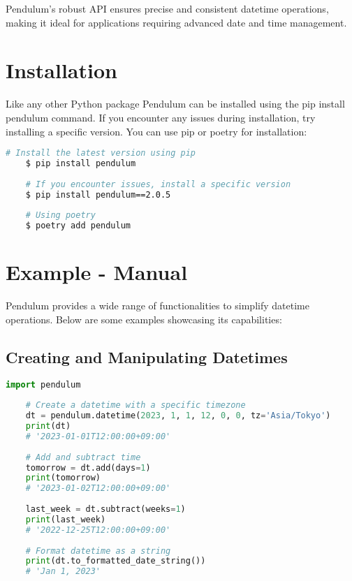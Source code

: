 Pendulum’s robust API ensures precise and consistent datetime operations, making it ideal for applications requiring advanced date and time management.

\section{Installation}

Like any other Python package Pendulum can be installed using the pip install pendulum command. If you encounter any issues during installation, try installing a specific version. You can use pip or poetry for installation:
\begin{lstlisting}[language=Bash, caption={Installing Pendulum via pip and poetry}, label={code:install-pendulum}, style=bashstyle]
	# Install the latest version using pip
	$ pip install pendulum
	
	# If you encounter issues, install a specific version
	$ pip install pendulum==2.0.5
	
	# Using poetry
	$ poetry add pendulum
\end{lstlisting}



\section{Example - Manual}

Pendulum provides a wide range of functionalities to simplify datetime operations. Below are some examples showcasing its capabilities:

\subsection{Creating and Manipulating Datetimes}
\begin{lstlisting}[language=Python, caption={Creating and Manipulating Datetimes with Pendulum}, label={code:pendulum-datetime-manipulation}, style=pythonstyle]
	import pendulum
	
	# Create a datetime with a specific timezone
	dt = pendulum.datetime(2023, 1, 1, 12, 0, 0, tz='Asia/Tokyo')
	print(dt)
	# '2023-01-01T12:00:00+09:00'
	
	# Add and subtract time
	tomorrow = dt.add(days=1)
	print(tomorrow)
	# '2023-01-02T12:00:00+09:00'
	
	last_week = dt.subtract(weeks=1)
	print(last_week)
	# '2022-12-25T12:00:00+09:00'
	
	# Format datetime as a string
	print(dt.to_formatted_date_string())
	# 'Jan 1, 2023'
\end{lstlisting}

